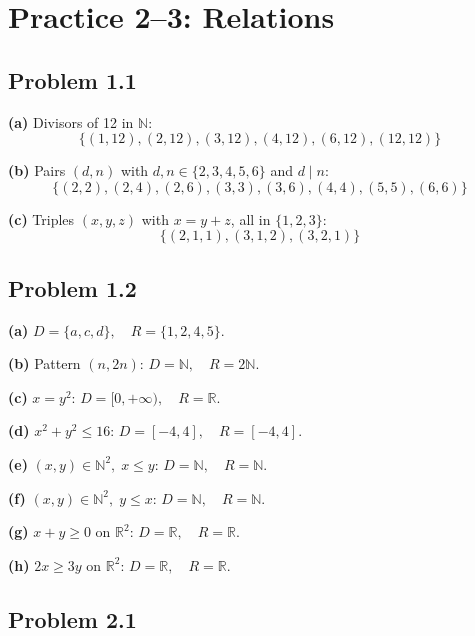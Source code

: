 \section*{Practice 2--3: Relations}


\subsection*{Problem 1.1}

\textbf{(a)} Divisors of 12 in $\mathbb{N}$:
\[
  \boxed{\{(1,12),(2,12),(3,12),(4,12),(6,12),(12,12)\}}
\]

\textbf{(b)} Pairs $(d,n)$ with $d,n\in\{2,3,4,5,6\}$ and $d\mid n$:
\[
  \boxed{\{(2,2),(2,4),(2,6),(3,3),(3,6),(4,4),(5,5),(6,6)\}}
\]

\textbf{(c)} Triples $(x,y,z)$ with $x=y+z$, all in $\{1,2,3\}$:
\[
  \boxed{\{(2,1,1),(3,1,2),(3,2,1)\}}
\]


\subsection*{Problem 1.2}

\textbf{(a)} $\boxed{D=\{a,c,d\},\quad R=\{1,2,4,5\}}$.

\textbf{(b)} Pattern $(n,2n)$: $\boxed{D=\mathbb{N},\quad R=2\mathbb{N}}$.

\textbf{(c)} $x=y^2$: $\boxed{D=[0,+\infty),\quad R=\mathbb{R}}$.

\textbf{(d)} $x^2+y^2\le 16$: $\boxed{D=[-4,4],\quad R=[-4,4]}$.

\textbf{(e)} $(x,y)\in\mathbb{N}^2,\; x\le y$: $\boxed{D=\mathbb{N},\quad R=\mathbb{N}}$.

\textbf{(f)} $(x,y)\in\mathbb{N}^2,\; y\le x$: $\boxed{D=\mathbb{N},\quad R=\mathbb{N}}$.

\textbf{(g)} $x+y\ge 0$ on $\mathbb{R}^2$: $\boxed{D=\mathbb{R},\quad R=\mathbb{R}}$.

\textbf{(h)} $2x\ge 3y$ on $\mathbb{R}^2$: $\boxed{D=\mathbb{R},\quad R=\mathbb{R}}$.


\subsection*{Problem 2.1}

